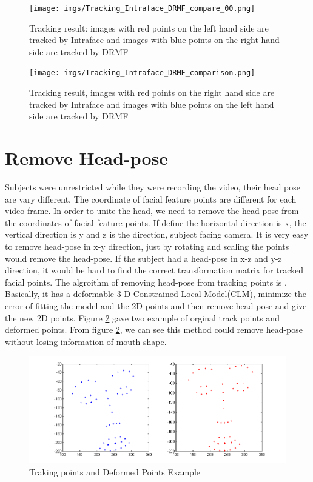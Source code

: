 \begin{figure}
\centering
\texttt{[image: imgs/Tracking\_Intraface\_DRMF\_compare\_00.png]}
\caption{Tracking result: images with red points on the left hand side are tracked by Intraface and images with blue points on the right hand side are tracked by DRMF}
\label{fig:cmp01}
\texttt{[image: imgs/Tracking\_Intraface\_DRMF\_comparison.png]}
\caption{Tracking result, images with red points on the right hand side are tracked by Intraface and images with blue points on the left hand side are tracked by DRMF}
\label{fig:cmp02}
\end{figure}
\newpage
\section{Remove Head-pose}
Subjects were unrestricted while they were recording the video, their head pose are vary different. The coordinate of facial feature points are different for each video frame. In order to unite the head, we need to remove the head pose from the coordinates of facial feature points.  If define the horizontal direction is x, the vertical direction is y and z is the direction, subject facing camera. It is very easy to remove head-pose in x-y direction, just by rotating and scaling the points would remove the head-pose. If the subject had a head-pose in x-z and y-z direction, it would be hard to find the correct transformation matrix for tracked facial points. The algroithm of removing head-pose from tracking points is \cite{saragih2011deformable}. Basically, it has a deformable 3-D Constrained Local Model(CLM), minimize the error of fitting the model and the 2D points and then remove head-pose and give the new 2D points. Figure \ref{fig:RHP} gave two example of orginal track points and deformed points. From figure \ref{fig:RHP}, we can see this method could remove head-pose without losing information of mouth shape.
\begin{figure}[ht]
\centering
\includegraphics[width=.6\textwidth]{imgs/160954_Deform_233.png}
\caption{Traking points and Deformed Points Example}
\label{fig:RHP}
\end{figure}
